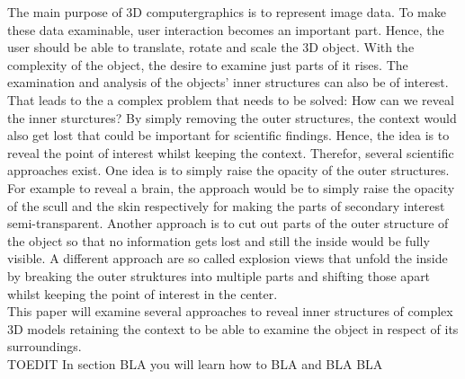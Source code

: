 
The main purpose of 3D computergraphics is to represent image data. To make these data examinable, user interaction becomes an important part. Hence, the user should be able to translate, rotate and scale the 3D object. With the complexity of the object, the desire to examine just parts of it rises. The examination and analysis of the objects' inner structures can also be of interest. That leads to the a complex problem that needs to be solved: How can we reveal the inner sturctures? By simply removing the outer structures, the context would also get lost that could be important for scientific findings. Hence, the idea is to reveal the point of interest whilst keeping the context. Therefor, several scientific approaches exist. One idea is to simply raise the opacity of the outer structures. For example to reveal a brain, the approach would be to simply raise the opacity of the scull and the skin respectively for making the parts of secondary interest semi-transparent. Another approach is to cut out parts of the outer structure of the object so that no information gets lost and still the inside would be fully visible. A different approach are so called explosion views that unfold the inside by breaking the outer struktures into multiple parts and shifting those apart whilst keeping the point of interest in the center.\\

This paper will examine several approaches to reveal inner structures of complex 3D models retaining the context to be able to examine the object in respect of its surroundings.\\
TOEDIT In section BLA you will learn how to BLA and BLA BLA